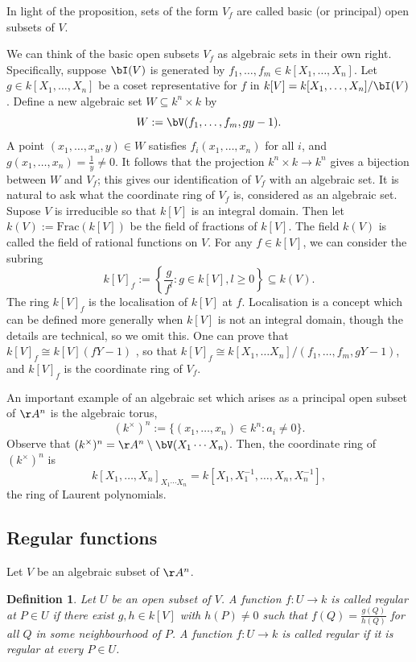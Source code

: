 \documentclass[12pt]{amsart}
\theoremstyle{plain}
\newtheorem{definition}[theorem]{Definition}
\begin{document}
In light of the proposition, sets of the form $V_f$ are called basic (or principal) open subsets of $V$.

We can think of the basic open subsets $V_f$ as algebraic sets in their own right.
Specifically, suppose $\bI(V)$ is generated by $f_1, \ldots, f_m \in k[X_1, \ldots, X_n]$.
Let $g \in k[X_1, \ldots, X_n]$ be a coset representative for $f$ in $k[V] = k[X_1, \ldots, X_n]/\bI(V)$.
Define a new algebraic set $W \subseteq k^n \times k$ by 
$$W:=\bV(f_1, \ldots, f_m, g y - 1).$$
A point $(x_1, \ldots, x_n, y) \in W$ satisfies $f_i(x_1, \ldots, x_n)$ for all $i$, and  $g(x_1, \ldots, x_n) = \frac{1}{y} \ne 0$.
It follows that the projection $k^n \times k \to k^n$ gives a bijection between $W$ and $V_f$; 
this gives our identification of $V_f$ with an algebraic set. 
It is natural to ask what the coordinate ring of $V_f$ is, considered as an algebraic set.
Supose $V$ is irreducible so that $k[V]$ is an integral domain.
Then let $k(V) := \mathrm{Frac}(k[V])$ be the field of fractions of $k[V]$.
The field $k(V)$ is called the field of rational functions on $V$.
For any $f \in k[V]$, we can consider the subring
$$k[V]_f := \left\{\frac{g}{f^l} : g \in k[V], l \ge 0\right\} \subseteq k(V).$$
The ring $k[V]_f$ is the localisation of $k[V]$ at $f$.
Localisation is a concept which can be defined more generally when $k[V]$ is not an integral domain, though the details are technical, so we omit this.
One can prove that $k[V]_f \cong k[V](f Y -1)$ \cite[Lemma 1.13]{Milne13}, so that $k[V]_f \cong k[X_1, \ldots X_n]/(f_1, \ldots, f_m, gY - 1)$, and $k[V]_f$ is the coordinate ring of $V_f$.

An important example of an algebraic set which arises as a principal open subset of $\AA^n$ is the algebraic torus,
$$(k^\times)^n := \{(x_1, \ldots, x_n) \in k^n : a_i \ne 0\}.$$
Observe that $(k^\times)^n = \AA^n \setminus \bV(X_1 \cdots X_n)$.
Then, the coordinate ring of $(k^\times)^n$ is 
$$k[X_1, \ldots, X_n]_{X_1 \cdots X_n} = k[X_1, X_1^{-1}, \ldots, X_n, X_n^{-1}],$$
the ring of Laurent polynomials.

\subsection{Regular functions}
Let $V$ be an algebraic subset of $\AA^n$.

\begin{definition}
Let $U$ be an open subset of $V$.
A function $f : U \to k$ is called regular at $P \in U$ if there exist $g, h \in k[V]$ with $h(P)\ne 0$ such that $f(Q) = \frac{g(Q)}{h(Q)}$ for all $Q$ in some neighbourhood of $P$.
A function $f:U\to k$ is called regular if it is regular at every $P \in U$.
\end{definition}
\end{document}
